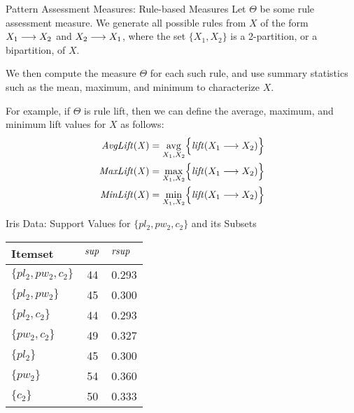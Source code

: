 \begin{frame}{Pattern Assessment Measures: Rule-based Measures}
Let $\Theta$ be some rule assessment measure.
We
generate all possible rules from $X$ of the form
$X_1 \arule X_2$ and $X_2 \arule X_1$, where
the set $\{X_1,X_2\}$ is a 2-partition, or a bipartition, of $X$.

\medskip
We then compute the measure $\Theta$ for each such rule, and
use summary statistics such as the mean, maximum, and minimum to characterize $X$.

\medskip
For example, if $\Theta$ is rule lift, then we can def\/{i}ne the average,
maximum, and minimum lift values for $X$ as follows:
\begin{align*}
  \mathit{AvgLift(X)} & =
  \mathop{\avg}_{X_1,X_2} \Bigl\{ \lift(X_1\arule X_2) \Bigr\}\\
  \mathit{MaxLift(X)} &
  = \max_{X_1,X_2} \Bigl\{ \lift(X_1\arule X_2) \Bigr\}\\
  \mathit{MinLift(X)} &
  = \min_{X_1,X_2} \Bigl\{ \lift(X_1\arule X_2) \Bigr\}
\end{align*}
\end{frame}


\begin{frame}{Iris Data: Support Values for $\{pl_2, pw_2, c_2\}$ and
  its Subsets}
\begin{center}
\begin{tabular}{|l|c|l|}
\hline
Itemset & $\mathit{sup}$ & $\mathit{rsup}$ \\ \hline
$\{pl_2, pw_2, c_2\}$ &  44 & 0.293\\ \hline\hline
$\{pl_2, pw_2\}$ &  45 & 0.300\\ \hline
$\{pl_2, c_2\}$ &  44 & 0.293\\ \hline
$\{pw_2, c_2\}$ &  49 & 0.327\\ \hline
$\{pl_2\}$ &  45 & 0.300\\ \hline
$\{pw_2\}$ &  54 & 0.360\\ \hline
$\{c_2\}$ &  50 & 0.333\\ \hline
\end{tabular}%
\end{center}
\end{frame}


